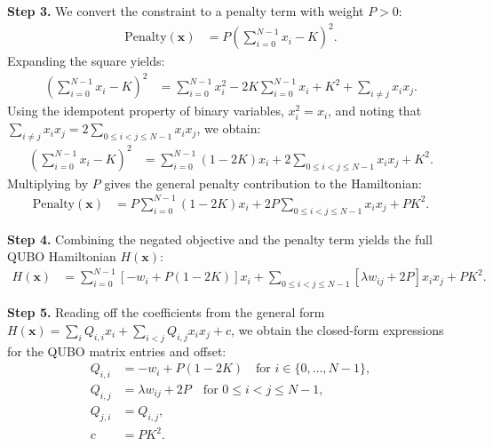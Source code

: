 \documentclass[12pt]{article}
\begin{document}
\textbf{Step 3.} We convert the constraint to a penalty term with weight $P > 0$:
\begin{align}
\text{Penalty}(\mathbf{x}) &= P \left( \sum_{i=0}^{N-1} x_i - K \right)^2.
\end{align}
Expanding the square yields:
\begin{align}
\left( \sum_{i=0}^{N-1} x_i - K \right)^2 &= \sum_{i=0}^{N-1} x_i^2 - 2K \sum_{i=0}^{N-1} x_i + K^2 + \sum_{i \neq j} x_i x_j.
\end{align}
Using the idempotent property of binary variables, $x_i^2 = x_i$, and noting that $\sum_{i \neq j} x_i x_j = 2 \sum_{0 \le i < j \le N-1} x_i x_j$, we obtain:
\begin{align}
\left( \sum_{i=0}^{N-1} x_i - K \right)^2 &= \sum_{i=0}^{N-1} (1 - 2K) x_i + 2 \sum_{0 \le i < j \le N-1} x_i x_j + K^2.
\end{align}
Multiplying by $P$ gives the general penalty contribution to the Hamiltonian:
\begin{align}
\text{Penalty}(\mathbf{x}) &= P \sum_{i=0}^{N-1} (1 - 2K) x_i + 2P \sum_{0 \le i < j \le N-1} x_i x_j + P K^2.
\end{align}

\textbf{Step 4.} Combining the negated objective and the penalty term yields the full QUBO Hamiltonian $H(\mathbf{x})$:
\begin{align}
H(\mathbf{x}) &= \sum_{i=0}^{N-1} \left[ -w_i + P(1 - 2K) \right] x_i + \sum_{0 \le i < j \le N-1} \left[ \lambda w_{ij} + 2P \right] x_i x_j + P K^2.
\end{align}

\textbf{Step 5.} Reading off the coefficients from the general form $H(\mathbf{x}) = \sum_{i} Q_{i,i} x_i + \sum_{i < j} Q_{i,j} x_i x_j + c$, we obtain the closed-form expressions for the QUBO matrix entries and offset:
\begin{align}
Q_{i,i} &= -w_i + P(1 - 2K) \quad \text{for } i \in \{0, \dots, N-1\}, \\
Q_{i,j} &= \lambda w_{ij} + 2P \quad \text{for } 0 \le i < j \le N-1, \\
Q_{j,i} &= Q_{i,j}, \\
c &= P K^2.
\end{align}
\end{document}
